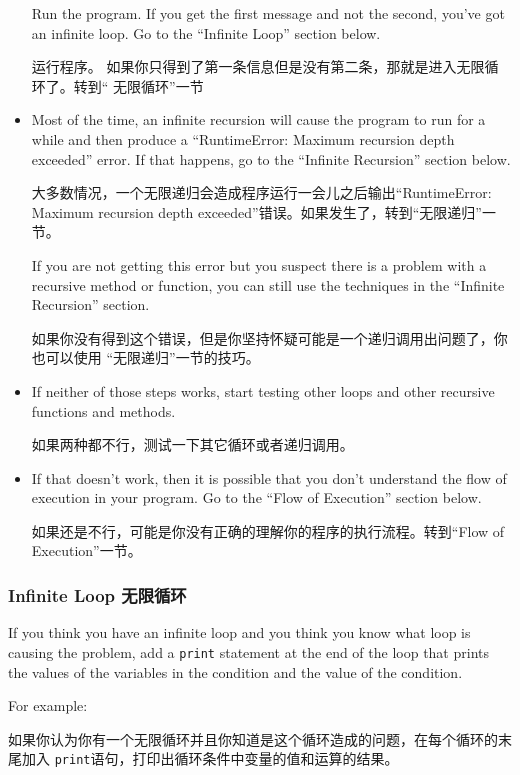 \documentclass[10pt]{book}
\begin{document}
\begin{CJK}{UTF8}{gbsn}
\begin{itemize}
Run the program.  If you get the first message and not the second,
you've got an infinite loop.  Go to the ``Infinite Loop'' section
below.

运行程序。 如果你只得到了第一条信息但是没有第二条，那就是进入无限循环了。转到``
无限循环''一节

\item Most of the time, an infinite recursion will cause the program
to run for a while and then produce a ``RuntimeError: Maximum
recursion depth exceeded'' error.  If that happens, go to the
``Infinite Recursion'' section below.

大多数情况，一个无限递归会造成程序运行一会儿之后输出``RuntimeError: Maximum
recursion depth exceeded''错误。如果发生了，转到``无限递归''一节。

If you are not getting this error but you suspect there is a problem
with a recursive method or function, you can still use the techniques
in the ``Infinite Recursion'' section.

如果你没有得到这个错误，但是你坚持怀疑可能是一个递归调用出问题了，你也可以使用
``无限递归''一节的技巧。

\item If neither of those steps works, start testing other
loops and other recursive functions and methods.

如果两种都不行，测试一下其它循环或者递归调用。

\item If that doesn't work, then it is possible that
you don't understand the flow of execution in your program.
Go to the ``Flow of Execution'' section below.

如果还是不行，可能是你没有正确的理解你的程序的执行流程。转到``Flow of Execution''一节。

\end{itemize}


\subsubsection{Infinite Loop 无限循环}

If you think you have an infinite loop and you think you know
what loop is causing the problem, add a {\tt print} statement at
the end of the loop that prints the values of the variables in
the condition and the value of the condition.

For example:

如果你认为你有一个无限循环并且你知道是这个循环造成的问题，在每个循环的末尾加入
{\tt print}语句，打印出循环条件中变量的值和运算的结果。


\end{CJK}
\end{document}
